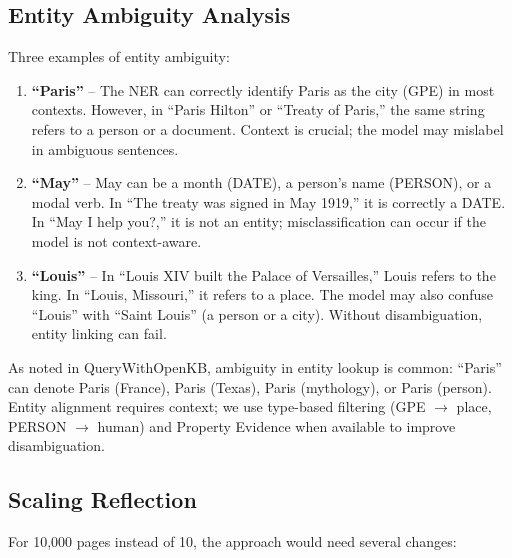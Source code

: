 \documentclass[11pt,a4paper]{article}
\begin{document}
  \subsection{Entity Ambiguity Analysis}

  Three examples of entity ambiguity:

  \begin{enumerate}
  \item \textbf{``Paris''} -- The NER can correctly identify Paris as the city (GPE) in most contexts. However, in ``Paris Hilton'' or ``Treaty of Paris,'' the same string refers to a person or a document. Context is crucial; the model may mislabel in ambiguous sentences.

  \item \textbf{``May''} -- May can be a month (DATE), a person's name (PERSON), or a modal verb. In ``The treaty was signed in May 1919,'' it is correctly a DATE. In ``May I help you?,'' it is not an entity; misclassification can occur if the model is not context-aware.

  \item \textbf{``Louis''} -- In ``Louis XIV built the Palace of Versailles,'' Louis refers to the king. In ``Louis, Missouri,'' it refers to a place. The model may also confuse ``Louis'' with ``Saint Louis'' (a person or a city). Without disambiguation, entity linking can fail.
  \end{enumerate}

  As noted in QueryWithOpenKB, ambiguity in entity lookup is common: ``Paris'' can denote Paris (France), Paris (Texas), Paris (mythology), or Paris (person). Entity alignment requires context; we use type-based filtering (GPE $\rightarrow$ place, PERSON $\rightarrow$ human) and Property Evidence when available to improve disambiguation.

  \subsection{Scaling Reflection}

  For 10,000 pages instead of 10, the approach would need several changes:
\end{document}
